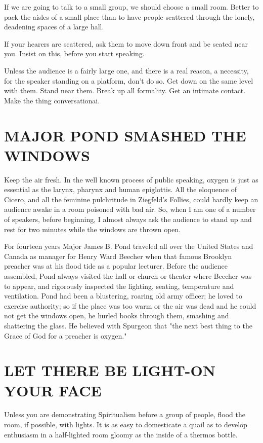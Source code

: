 \documentclass[10pt]{article}
\begin{document}
If we are going to talk to a small group, we should choose a small room. Better to pack the aisles of a small place than to have people scattered through the lonely, deadening spaces of a large hall.

If your hearers are scattered, ask them to move down front and be seated near you. Insist on this, before you start speaking.

Unless the audience is a fairly large one, and there is a real reason, a necessity, for the speaker standing on a platform, don't do so. Get down on the same level with them. Stand near them. Break up all formality. Get an intimate contact. Make the thing conversationai.

\section*{MAJOR POND SMASHED THE WINDOWS}
Keep the air fresh. In the well known process of public speaking, oxygen is just as essential as the larynx, pharynx and human epiglottis. All the eloquence of Cicero, and all the feminine pulchritude in Ziegfeld's Follies, could hardly keep an audience awake in a room poisoned with bad air. So, when I am one of a number of speakers, before beginning, I almost always ask the audience to stand up and rest for two minutes while the windows are thrown open.

For fourteen years Major James B. Pond traveled all over the United States and Canada as manager for Henry Ward Beecher when that famous Brooklyn preacher was at his flood tide as a popular lecturer. Before the audience assembled, Pond always visited the hall or church or theater where Beecher was to appear, and rigorously inspected the lighting, seating, temperature and ventilation. Pond had been a blustering, roaring old army officer; he loved to exercise authority; so if the place was too warm or the air was dead and he could not get the windows open, he hurled books through them, smashing and shattering the glass. He believed with Spurgeon that "the next best thing to the Grace of God for a preacher is oxygen."

\section*{LET THERE BE LIGHT-ON YOUR FACE}
Unless you are demonstrating Spiritualism before a group of people, flood the room, if possible, with lights. It is as easy to domesticate a quail as to develop\\
enthusiasm in a half-lighted room gloomy as the inside of a thermos bottle.
\end{document}
